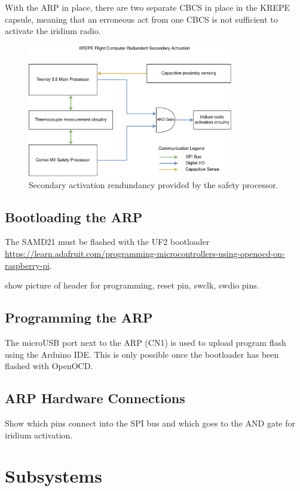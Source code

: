 \documentclass{article}
\begin{document}
With the ARP in place, there are two separate CBCS in place in the KREPE capsule, meaning that an erroneous act from one CBCS is not sufficient to activate the iridium radio. 

\begin{figure}
  \centering
  \includegraphics[width=0.8\textwidth]{images/redundant-activation.png}
  \caption{Secondary activation rendundancy provided by the safety processor.}
  \label{fig:actred}
\end{figure}

\subsection{Bootloading the ARP}
The SAMD21 must be flashed with the UF2 bootloader \url{https://learn.adafruit.com/programming-microcontrollers-using-openocd-on-raspberry-pi}.

show picture of header for programming, reset pin, swclk, swdio pins. 
\subsection{Programming the ARP}
The microUSB port next to the ARP (CN1) is used to upload program flash using the Arduino IDE. This is only possible once the bootloader has been flashed with OpenOCD.

\subsection{ARP Hardware Connections}
Show which pins connect into the SPI bus and which goes to the AND gate for iridium activation.

\section{Subsystems}
\end{document}
